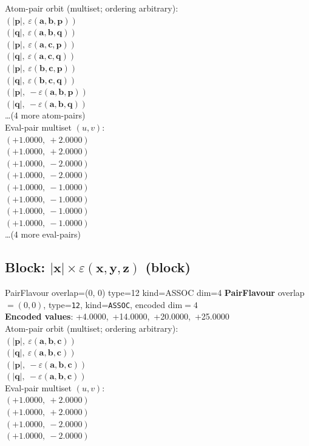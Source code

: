 \documentclass[a4paper,11pt]{article}
\newcommand{\vc}[1]{\ensuremath{\mathbf{#1}}}
\newcommand{\dnfagmiihhiejm}[1]{|\vc{#1}|}
\newcommand{\kblbmcpggoncpf}[3]{\varepsilon(\mathbf{#1},\mathbf{#2},\mathbf{#3})}
\begin{document}
\quad Atom-pair orbit (multiset; ordering arbitrary):\\
$(\dnfagmiihhiejm{p},\ \kblbmcpggoncpf{a}{b}{p})$\\
$(\dnfagmiihhiejm{q},\ \kblbmcpggoncpf{a}{b}{q})$\\
$(\dnfagmiihhiejm{p},\ \kblbmcpggoncpf{a}{c}{p})$\\
$(\dnfagmiihhiejm{q},\ \kblbmcpggoncpf{a}{c}{q})$\\
$(\dnfagmiihhiejm{p},\ \kblbmcpggoncpf{b}{c}{p})$\\
$(\dnfagmiihhiejm{q},\ \kblbmcpggoncpf{b}{c}{q})$\\
$(\dnfagmiihhiejm{p},\ -\kblbmcpggoncpf{a}{b}{p})$\\
$(\dnfagmiihhiejm{q},\ -\kblbmcpggoncpf{a}{b}{q})$\\
\quad \ldots (4 more atom-pairs)\\
\quad Eval-pair multiset $(u, v)$:\\
$(+1.0000,\ +2.0000)$\\
$(+1.0000,\ +2.0000)$\\
$(+1.0000,\ -2.0000)$\\
$(+1.0000,\ -2.0000)$\\
$(+1.0000,\ -1.0000)$\\
$(+1.0000,\ -1.0000)$\\
$(+1.0000,\ -1.0000)$\\
$(+1.0000,\ -1.0000)$\\
\quad \ldots (4 more eval-pairs)\\

\subsection{Block: $\dnfagmiihhiejm{x} \times \kblbmcpggoncpf{x}{y}{z}$  (block)}
    PairFlavour  overlap=(0, 0)  type=12  kind=ASSOC  dim=4
\textbf{PairFlavour} overlap$=(0, 0)$, type=\texttt{12}, kind=\texttt{ASSOC}, encoded dim$=4$\\
\textbf{      Encoded values}: +4.0000,\ +14.0000,\ +20.0000,\ +25.0000\\
\quad Atom-pair orbit (multiset; ordering arbitrary):\\
$(\dnfagmiihhiejm{p},\ \kblbmcpggoncpf{a}{b}{c})$\\
$(\dnfagmiihhiejm{q},\ \kblbmcpggoncpf{a}{b}{c})$\\
$(\dnfagmiihhiejm{p},\ -\kblbmcpggoncpf{a}{b}{c})$\\
$(\dnfagmiihhiejm{q},\ -\kblbmcpggoncpf{a}{b}{c})$\\
\quad Eval-pair multiset $(u, v)$:\\
$(+1.0000,\ +2.0000)$\\
$(+1.0000,\ +2.0000)$\\
$(+1.0000,\ -2.0000)$\\
$(+1.0000,\ -2.0000)$\\
\end{document}
